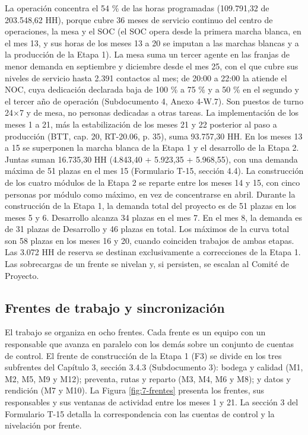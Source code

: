 La operación concentra el 54 \% de las horas programadas (109.791,32 de 203.548,62 HH), porque cubre 36 meses de servicio continuo del centro de operaciones, la mesa y el SOC (el SOC opera desde la primera marcha blanca, en el mes 13, y sus horas de los meses 13 a 20 se imputan a las marchas blancas y a la producción de la Etapa 1). La mesa suma un tercer agente en las franjas de menor demanda en septiembre y diciembre desde el mes 25, con el que cubre sus niveles de servicio hasta 2.391 contactos al mes; de 20:00 a 22:00 la atiende el NOC, cuya dedicación declarada baja de 100 \% a 75 \% y a 50 \% en el segundo y el tercer año de operación (Subdocumento 4, Anexo 4-W.7). Son puestos de turno 24\ensuremath{\times}7 y de mesa, no personas dedicadas a otras tareas. La implementación de los meses 1 a 21, más la estabilización de los meses 21 y 22 posterior al paso a producción (BTT, cap. 20, RT-20.06, p. 35), suma 93.757,30 HH. En los meses 13 a 15 se superponen la marcha blanca de la Etapa 1 y el desarrollo de la Etapa 2. Juntas suman 16.735,30 HH (4.843,40 + 5.923,35 + 5.968,55), con una demanda máxima de 51 plazas en el mes 15 (Formulario T-15, sección 4.4). La construcción de los cuatro módulos de la Etapa 2 se reparte entre los meses 14 y 15, con cinco personas por módulo como máximo, en vez de concentrarse en abril. Durante la construcción de la Etapa 1, la demanda total del proyecto es de 51 plazas en los meses 5 y 6. Desarrollo alcanza 34 plazas en el mes 7. En el mes 8, la demanda es de 31 plazas de Desarrollo y 46 plazas en total. Los máximos de la curva total son 58 plazas en los meses 16 y 20, cuando coinciden trabajos de ambas etapas. Las 3.072 HH de reserva se destinan exclusivamente a correcciones de la Etapa 1. Las sobrecargas de un frente se nivelan y, si persisten, se escalan al Comité de Proyecto.

\subsection{Frentes de trabajo y sincronización}

El trabajo se organiza en ocho frentes. Cada frente es un equipo con un responsable que avanza en paralelo con los demás sobre un conjunto de cuentas de control. El frente de construcción de la Etapa 1 (F3) se divide en los tres subfrentes del Capítulo 3, sección 3.4.3 (Subdocumento 3): bodega y calidad (M1, M2, M5, M9 y M12); preventa, rutas y reparto (M3, M4, M6 y M8); y datos y rendición (M7 y M10). La Figura \ref{fig:7-frentes} presenta los frentes, sus responsables y sus ventanas de actividad entre los meses 1 y 21. La sección 3 del Formulario T-15 detalla la correspondencia con las cuentas de control y la nivelación por frente.

